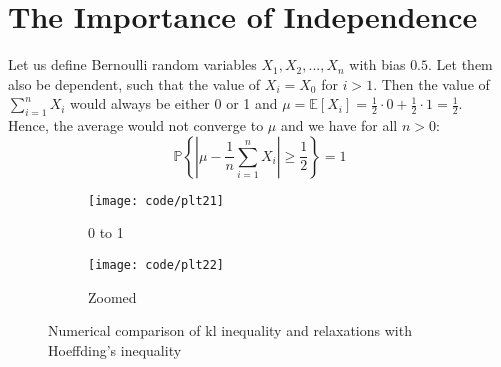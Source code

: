 \documentclass[a4paper]{article}
\begin{document}
\section{The Importance of Independence}
Let us define Bernoulli random variables $X_1, X_2, ..., X_n$ with bias $0.5$.
Let them also be dependent, such that the value of $X_i = X_0$ for $i>1$. Then the value of
$\sum_{i=1}^{n} X_{i}$ would always be either 0 or 1 and
$\mu = \mathbb{E}\left[X_{i}\right] = \frac{1}{2} \cdot 0 + \frac{1}{2} \cdot 1 = \frac{1}{2}$.\\
Hence, the average would not converge to $\mu$ and we have for all $n > 0$:
$$
\mathbb{P}\left\{\left|\mu-\frac{1}{n} \sum_{i=1}^{n} X_{i}\right| \geq \frac{1}{2}\right\}=1
$$

\begin{figure}
  \centering
  \begin{subfigure}[b]{\textwidth}
    \centering
    \texttt{[image: code/plt21]}
    \caption{0 to 1}
  \end{subfigure}
  \begin{subfigure}[b]{\textwidth}
    \centering
    \texttt{[image: code/plt22]}
    \caption{Zoomed}
  \end{subfigure}
  \caption{Numerical comparison of kl inequality and relaxations with Hoeffding’s inequality}
  \label{plt1}
\end{figure}
\end{document}
